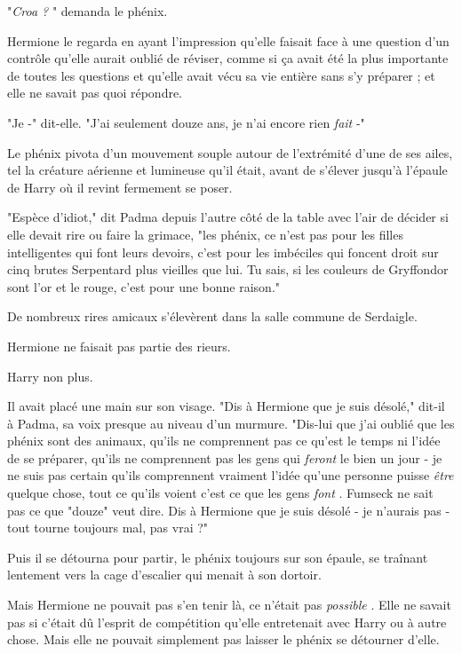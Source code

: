 "\emph{Croa ?} " demanda le phénix.

Hermione le regarda en ayant l'impression qu'elle faisait face à une question d'un contrôle qu'elle aurait oublié de réviser, comme si ça avait été la plus importante de toutes les questions et qu'elle avait vécu sa vie entière sans s'y préparer ; et elle ne savait pas quoi répondre.

"Je -" dit-elle. "J'ai seulement douze ans, je n'ai encore rien \emph{fait}  -"

Le phénix pivota d'un mouvement souple autour de l'extrémité d'une de ses ailes, tel la créature aérienne et lumineuse qu'il était, avant de s'élever jusqu'à l'épaule de Harry où il revint fermement se poser.

"Espèce d'idiot," dit Padma depuis l'autre côté de la table avec l'air de décider si elle devait rire ou faire la grimace, "les phénix, ce n'est pas pour les filles intelligentes qui font leurs devoirs, c'est pour les imbéciles qui foncent droit sur cinq brutes Serpentard plus vieilles que lui. Tu sais, si les couleurs de Gryffondor sont l'or et le rouge, c'est pour une bonne raison."

De nombreux rires amicaux s'élevèrent dans la salle commune de Serdaigle.

Hermione ne faisait pas partie des rieurs.

Harry non plus.

Il avait placé une main sur son visage. "Dis à Hermione que je suis désolé," dit-il à Padma, sa voix presque au niveau d'un murmure. "Dis-lui que j'ai oublié que les phénix sont des animaux, qu'ils ne comprennent pas ce qu'est le temps ni l'idée de se préparer, qu'ils ne comprennent pas les gens qui \emph{feront}  le bien un jour - je ne suis pas certain qu'ils comprennent vraiment l'idée qu'une personne puisse \emph{être}  quelque chose, tout ce qu'ils voient c'est ce que les gens \emph{font} . Fumseck ne sait pas ce que "douze" veut dire. Dis à Hermione que je suis désolé - je n'aurais pas - tout tourne toujours mal, pas vrai ?"

Puis il se détourna pour partir, le phénix toujours sur son épaule, se traînant lentement vers la cage d'escalier qui menait à son dortoir.

Mais Hermione ne pouvait pas s'en tenir là, ce n'était pas \emph{possible} . Elle ne savait pas si c'était dû l'esprit de compétition qu'elle entretenait avec Harry ou à autre chose. Mais elle ne pouvait simplement pas laisser le phénix se détourner d'elle.

